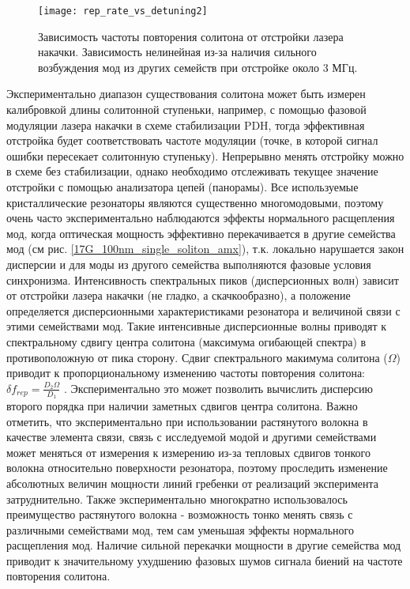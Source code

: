 \begin{figure}[ht]
\centering
  \texttt{[image: rep\_rate\_vs\_detuning2]}
  \caption{Зависимость частоты повторения солитона от отстройки лазера накачки. Зависимость нелинейная из-за наличия сильного возбуждения мод из других семейств при отстройке около 3 МГц.}
  \label{rep_rate_vs_detuning}
\end{figure}

Экспериментально диапазон существования солитона может быть измерен калибровкой длины солитонной ступеньки, например, с помощью фазовой модуляции лазера накачки в схеме стабилизации PDH, тогда эффективная отстройка будет соответствовать частоте модуляции (точке, в которой сигнал ошибки пересекает солитонную ступеньку). Непрерывно менять отстройку можно в схеме без стабилизации, однако необходимо отслеживать текущее значение отстройки с помощью анализатора цепей (панорамы). Все используемые кристаллические резонаторы являются существенно многомодовыми, поэтому очень часто экспериментально наблюдаются эффекты нормального расщепления мод, когда оптическая мощность эффективно перекачивается в другие семейства мод (см рис. \ref{17G_100nm_single_soliton_amx}), т.к. локально нарушается закон дисперсии и для моды из другого семейства выполняются фазовые условия синхронизма. Интенсивность спектральных пиков (дисперсионных волн) зависит от отстройки лазера накачки (не гладко, а скачкообразно), а положение определяется дисперсионными характеристиками резонатора и величиной связи с этими семействами мод. Такие интенсивные дисперсионные волны приводят к спектральному сдвигу центра солитона (максимума огибающей спектра) в противоположную от пика сторону. Сдвиг спектрального макимума солитона ($\Omega$) приводит к пропорциональному изменению частоты повторения солитона: $\delta f_{rep}=\frac{D_2\Omega}{D_1}$ \cite{Yang:16}. Экспериментально это может позволить вычислить дисперсию второго порядка при наличии заметных сдвигов центра солитона. Важно отметить, что экспериментально при использовании растянутого волокна в качестве элемента связи, связь с исследуемой модой и другими семействами может меняться от измерения к измерению из-за тепловых сдвигов тонкого волокна относительно поверхности резонатора, поэтому проследить изменение абсолютных величин мощности линий гребенки от реализаций эксперимента затруднительно. Также экспериментально многократно использовалось преимущество растянутого волокна - возможность тонко менять связь с различными семействами мод, тем сам уменьшая эффекты нормального расщепления мод. Наличие сильной перекачки мощности в другие семейства мод приводит к значительному ухудшению фазовых шумов сигнала биений на частоте повторения солитона.

